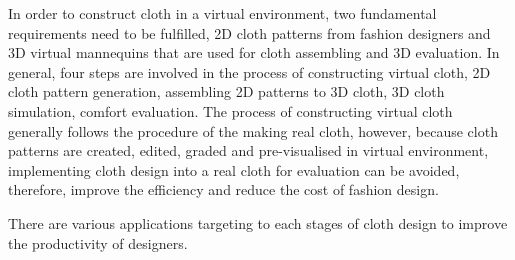 In order to construct cloth in a virtual environment, two fundamental requirements need to be fulfilled, 2D cloth patterns from fashion designers and 3D virtual mannequins that are used for cloth assembling and 3D evaluation. In general, four steps are involved in the process of constructing virtual cloth, 2D cloth pattern generation, assembling 2D patterns to 3D cloth, 3D cloth simulation, comfort evaluation. The process of constructing virtual cloth generally follows the procedure of the making real cloth, however, because cloth patterns are created, edited, graded and pre-visualised in virtual environment, implementing cloth design into a real cloth for evaluation can be avoided, therefore, improve the efficiency and reduce the cost of fashion design. 

There are various applications targeting to each stages of cloth design to improve the productivity of designers. 

